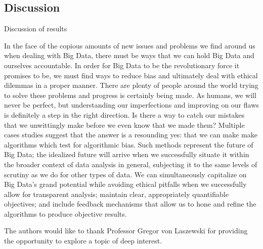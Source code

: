 \documentclass[sigconf]{acmart}
\begin{document}
\subsection{Discussion}

Discussion of results

In the face of the copious amounts of new issues and problems we find around us when dealing with Big Data, there must be ways that we can hold Big Data and ourselves accountable. In order for Big Data to be the revolutionary force it promises to be, we must find ways to reduce bias and ultimately deal with ethical dilemmas in a proper manner. There are plenty of people around the world trying to solve these problems and progress is certainly being made. As humans, we will never be perfect, but understanding our imperfections and improving on our flaws is definitely a step in the right direction. Is there a way to catch our mistakes that we unwittingly make before we even know that we made them? Multiple cases studies suggest that the answer is a resounding yes: that we can make make algorithms which test for algorithmic bias. Such methods represent the future of Big Data; the idealized future will arrive when we successfully situate it within the broader context of data analysis in general, subjecting it to the same levels of scrutiny as we do for other types of data. We can simultaneously capitalize on Big Data's grand potential while avoiding ethical pitfalls when we successfully allow for transparent analysis; maintain clear, appropriately quantifiable objectives; and include feedback mechanisms that allow us to hone and refine the algorithms to produce objective results. 


\begin{acks}
The authors would like to thank Professor Gregor von Laszewski for providing the opportunity to explore a topic of deep interest.

\end{acks}



 
\end{document}
